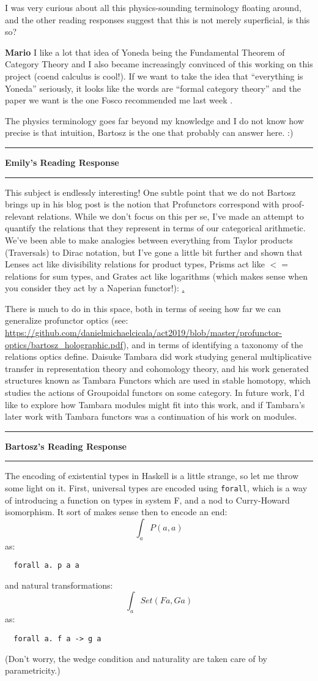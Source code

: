 \documentclass{amsart}
\newcommand{\iam}[1]{
  \vspace{0.25em}
  \hrule
  \vspace{0.25em}
  \textbf{{#1}'s Reading Response}
  \vspace{0.25em}
  \hrule
  \vspace{1em}
}
\newcommand{\respond}[1]{
  \vspace{1em} \textbf{#1}
}
\begin{document}
I was very curious about all this physics-sounding terminology floating around, and the other reading responses suggest that this is not merely superficial, is this so?

\respond{Mario} I like a lot that idea of Yoneda being the
Fundamental Theorem of Category Theory and I also became increasingly
convinced of this working on this project (coend calculus is cool!).
If we want to take the idea that ``everything is Yoneda'' seriously,
it looks like the words are ``formal category theory'' and the paper
we want is the one Fosco recommended me last week \cite{unicityDiLibertiLoregian}.

The physics terminology goes far beyond my knowledge and I do not know
how precise is that intuition, Bartosz is the one that probably can answer
here. :)
   
\iam{Emily}

This subject is endlessly interesting! One subtle point that we do not Bartosz brings up in his blog post is the notion that Profunctors correspond with proof-relevant relations. While we don't focus on this per se, I've made an attempt to quantify the relations that they represent in terms of our categorical arithmetic. We've been able to make analogies between everything from Taylor products (Traversals) to Dirac notation, but I've gone a little bit further and shown that Lenses act like divisibility relations for product types, Prisms act like $<=$ relations for sum types, and Grates act like logarithms (which makes sense when you consider they act by a Naperian functor!): \href{ https://gist.github.com/emilypi/407838d9c321d5b21ebc1828ad2bedcb}.

There is much to do in this space, both in terms of seeing how far we can generalize profunctor optics (see: \url{https://github.com/danielmichaelcicala/act2019/blob/master/profunctor-optics/bartosz_holographic.pdf}), and in terms of identifying a taxonomy of the relations optics define. Daisuke Tambara did work studying general multiplicative transfer in representation theory and cohomology theory, and his work generated structures known as Tambara Functors which are used in stable homotopy, which studies the actions of Groupoidal functors on some category. In future work, I'd like to explore how Tambara modules might fit into this work, and if Tambara's later work with Tambara functors was a continuation of his work on modules.


\iam{Bartosz}
The encoding of existential types in Haskell is a little strange, so let me throw some light on it. First, universal types are encoded using \verb|forall|, which is a way of introducing a function on types in system F, and a nod to Curry-Howard isomorphism. It sort of makes sense then to encode an end:
\[\int_a P(a, a) \]
as:
\begin{verbatim}
  forall a. p a a
\end{verbatim}
and natural transformations:
\[\int_a Set(F a, G a)\]
as:
\begin{verbatim}
  forall a. f a -> g a
\end{verbatim}
(Don't worry, the wedge condition and naturality are taken care of by parametricity.)
\end{document}
